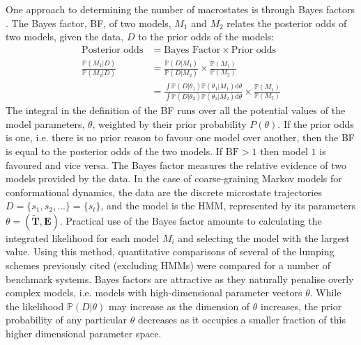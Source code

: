 One approach to determining the number of macrostates is through Bayes factors \cite{kassBayesFactors1995}. The Bayes factor, BF, of two models, $M_{1}$ and $M_{2}$ relates the posterior odds of two models, given the data, $D$ to the prior odds of the models: \cite{kassBayesFactors1995}
\begin{align}
\text{Posterior odds} & = \text{Bayes Factor} \times \text{Prior odds} \\
\frac{ \mathbb{P}(M_1|D) }{ \mathbb{P}(M_2|D) } & = \frac{ \mathbb{P}(D|M_1) }{ \mathbb{P}(D|M_2) } \times \frac{ \mathbb{P}(M_1) }{ \mathbb{P}(M_2) }\\
& = \frac{\int \mathbb{P}\left( D | \theta_{1} \right)\mathbb{P}(\theta_{1}|M_{1}) \mathrm{d}\theta}{\int \mathbb{P}\left( D | \theta_{2} \right)\mathbb{P}(\theta_{2}|M_{2}) \mathrm{d}\theta} \times \frac{\mathbb{P}(M_1)}{\mathbb{P}(M_2)}
\end{align}
The integral in the definition of the BF runs over all the potential values of the model parameters, $\theta$, weighted by their prior probability $P(\theta)$. If the prior odds is one, i.e. there is no prior reason to favour one model over another, then the BF is equal to the posterior odds of the two models. If $\textrm{BF} > 1$ then model $1$ is favoured and vice versa. The Bayes factor measures the relative evidence of two models provided by the data. \cite{kassBayesFactors1995}In the case of coarse-graining Markov models for conformational dynamics, the data are the discrete microstate trajectories $D = \{s_1, s_2, ...\}= \{s_t\}$, and the model is the HMM, represented by its parameters $\theta = (\tilde{\mathbf{T}}, \mathbf{E})$.\cite{bacalladoBayesianComparisonMarkov2009a}   Practical use of the Bayes factor amounts to calculating the integrated likelihood  for each model $M_i$ and selecting the model with the largest value. Using this method, quantitative comparisons of several of the lumping schemes previously cited  (excluding HMMs) were  compared for a number of benchmark systems.\cite{bowmanQuantitativeComparisonAlternative2013} Bayes factors are attractive as they naturally penalise overly complex models, i.e. models with high-dimensional parameter vectors $\theta$. While the likelihood $\mathbb{P}(D|\theta)$ may increase as the dimension of $\theta$ increases, the prior probability of any particular $\theta$ decreases as it occupies a smaller fraction of this higher dimensional parameter space.\cite{kassBayesFactors1995}\cite{mackay2003information}


